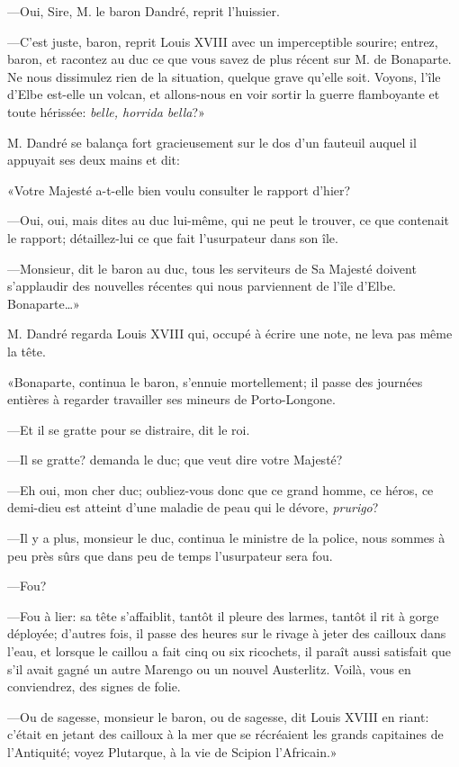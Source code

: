—Oui, Sire, M. le baron Dandré, reprit l'huissier.

—C'est juste, baron, reprit Louis XVIII avec un imperceptible sourire; entrez, baron, et racontez au duc ce que vous savez de plus récent sur M. de Bonaparte. Ne nous dissimulez rien de la situation, quelque grave qu'elle soit. Voyons, l'île d'Elbe est-elle un volcan, et allons-nous en voir sortir la guerre flamboyante et toute hérissée: \textit{belle, horrida bella}?»

M. Dandré se balança fort gracieusement sur le dos d'un fauteuil auquel il appuyait ses deux mains et dit:

«Votre Majesté a-t-elle bien voulu consulter le rapport d'hier?

—Oui, oui, mais dites au duc lui-même, qui ne peut le trouver, ce que contenait le rapport; détaillez-lui ce que fait l'usurpateur dans son île.

—Monsieur, dit le baron au duc, tous les serviteurs de Sa Majesté doivent s'applaudir des nouvelles récentes qui nous parviennent de l'île d'Elbe. Bonaparte\dots»

M. Dandré regarda Louis XVIII qui, occupé à écrire une note, ne leva pas même la tête.

«Bonaparte, continua le baron, s'ennuie mortellement; il passe des journées entières à regarder travailler ses mineurs de Porto-Longone.

—Et il se gratte pour se distraire, dit le roi.

—Il se gratte? demanda le duc; que veut dire votre Majesté?

—Eh oui, mon cher duc; oubliez-vous donc que ce grand homme, ce héros, ce demi-dieu est atteint d'une maladie de peau qui le dévore, \textit{prurigo}?

—Il y a plus, monsieur le duc, continua le ministre de la police, nous sommes à peu près sûrs que dans peu de temps l'usurpateur sera fou.

—Fou?

—Fou à lier: sa tête s'affaiblit, tantôt il pleure des larmes, tantôt il rit à gorge déployée; d'autres fois, il passe des heures sur le rivage à jeter des cailloux dans l'eau, et lorsque le caillou a fait cinq ou six ricochets, il paraît aussi satisfait que s'il avait gagné un autre Marengo ou un nouvel Austerlitz. Voilà, vous en conviendrez, des signes de folie.

—Ou de sagesse, monsieur le baron, ou de sagesse, dit Louis XVIII en riant: c'était en jetant des cailloux à la mer que se récréaient les grands capitaines de l'Antiquité; voyez Plutarque, à la vie de Scipion l'Africain.»

